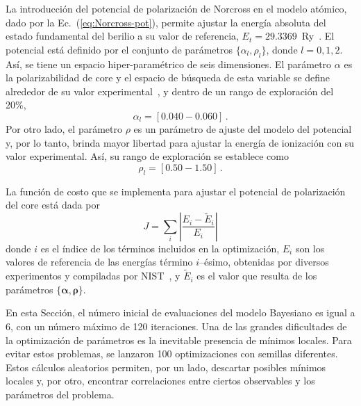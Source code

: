 La introducción del potencial de polarización de Norcross en el modelo 
atómico, dado por la Ec.~(\ref{eq:Norcross-pot}), permite ajustar la 
energía absoluta del estado fundamental del berilio a su valor de 
referencia, \mbox{$E_t=29.3369$ Ry}~\cite{NIST}. El potencial está 
definido por el conjunto de parámetros $\{\alpha_l,\rho_l\}$, donde 
$l=0,1,2$. Así, se tiene un espacio hiper-paramétrico de seis 
dimensiones. El parámetro $\alpha$ es la polarizabilidad de core y el 
espacio de búsqueda de esta variable se define alrededor de su valor 
experimental~\cite{Dalgarno:62,Sitz:71}, 
y dentro de un rango de exploración del 20\%,
\begin{equation}
\alpha_l=[0.040-0.060]\,.
\end{equation}
Por otro lado, el parámetro $\rho$ es un parámetro de ajuste del modelo 
del potencial y, por lo tanto, brinda mayor libertad para ajustar la 
energía de ionización con su valor experimental. Así, su rango de 
exploración se establece como
\begin{equation}
\rho_l=[0.50-1.50]\,.
\end{equation}

La función de costo que se implementa para ajustar el potencial de 
polarización del core está dada por 
\begin{equation}
J=\sum_{i} \left|\frac{E_{i}-\tilde{E}_{i}}{E_{i}} \right|
\label{eq:Jpol}
\end{equation}
donde $i$ es el índice de los términos incluidos en la optimización, 
$E_{i}$ son los valores de referencia de las energías término 
$i$--ésimo, obtenidas por diversos experimentos y compiladas por 
NIST~\cite{NIST}, y $\tilde{E}_{i}$ es el valor que resulta de los 
parámetros $\{\boldsymbol\alpha,\boldsymbol\rho\}$.

En esta Sección, el número inicial de evaluaciones del modelo Bayesiano 
es igual a 6, con un número máximo de 120 iteraciones. Una de las 
grandes dificultades de la optimización de parámetros es la inevitable 
presencia de mínimos locales. Para evitar estos problemas, se lanzaron 
100 optimizaciones con semillas diferentes. Estos cálculos aleatorios
permiten, por un lado, descartar posibles mínimos locales y, por otro, 
encontrar correlaciones entre ciertos observables y los parámetros del 
problema. 

